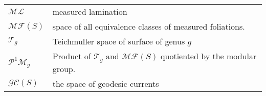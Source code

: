 \begin{tabular}{ll}
  $\mathcal{ML}$ &  measured lamination  \\
  $\mathcal{MF}(S)$ & space of all equivalence classes of measured foliations. \\
  $\mathcal{T}_g$ & Teichmuller space of surface of genus $g$ \\
  $\mathcal{P}^1 \mathcal{M}_g$ & Product of $\mathcal{T}_g$  and $\mathcal{MF}(S)$ quotiented by the modular group. \\
$\mathcal{GC}(S)$  & the space of geodesic currents \\
\end{tabular}

